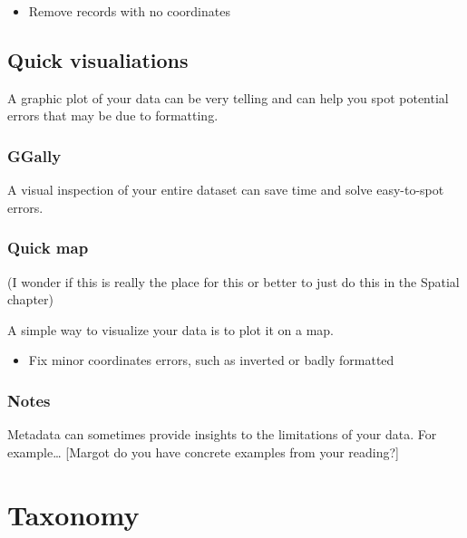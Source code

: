 \documentclass[
  letterpaper,
  DIV=11,
  numbers=noendperiod,
  oneside]{scrreprt}
\providecommand{\tightlist}{%
  \setlength{\itemsep}{0pt}\setlength{\parskip}{0pt}}\usepackage{longtable,booktabs,array}
\begin{document}
\begin{itemize}
\tightlist
\item
  Remove records with no coordinates
\end{itemize}

\hypertarget{quick-visualiations}{%
\section{Quick visualiations}\label{quick-visualiations}}

A graphic plot of your data can be very telling and can help you spot
potential errors that may be due to formatting.

\hypertarget{ggally}{%
\subsection{GGally}\label{ggally}}

A visual inspection of your entire dataset can save time and solve
easy-to-spot errors.

\hypertarget{quick-map}{%
\subsection{Quick map}\label{quick-map}}

(I wonder if this is really the place for this or better to just do this
in the Spatial chapter)

A simple way to visualize your data is to plot it on a map.

\begin{itemize}
\tightlist
\item
  Fix minor coordinates errors, such as inverted or badly formatted
\end{itemize}

\hypertarget{notes}{%
\subsection{Notes}\label{notes}}

Metadata can sometimes provide insights to the limitations of your data.
For example\ldots{} {[}Margot do you have concrete examples from your
reading?{]}


\hypertarget{sec-standardise-taxonomy}{%
\chapter{Taxonomy}\label{sec-standardise-taxonomy}}
\end{document}
